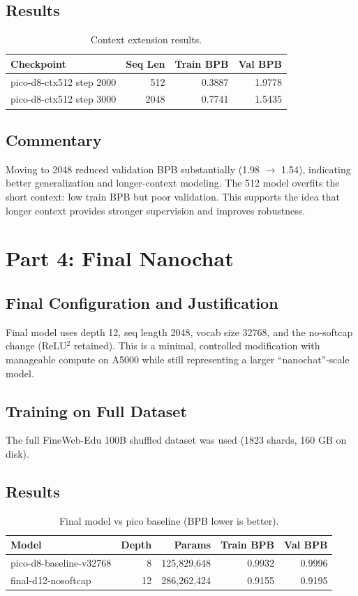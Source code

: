 \documentclass[11pt]{article}
\begin{document}
\subsection*{Results}
\begin{table}[h]
\centering
\begin{tabular}{l r r r}
\toprule
\textbf{Checkpoint} & \textbf{Seq Len} & \textbf{Train BPB} & \textbf{Val BPB} \\
\midrule
pico-d8-ctx512 step 2000 & 512 & 0.3887 & 1.9778 \\
pico-d8-ctx512 step 3000 & 2048 & 0.7741 & 1.5435 \\
\bottomrule
\end{tabular}
\caption{Context extension results.}
\end{table}

\subsection*{Commentary}
Moving to 2048 reduced validation BPB substantially (1.98 $\rightarrow$ 1.54), indicating better generalization and longer-context modeling. The 512 model overfits the short context: low train BPB but poor validation. This supports the idea that longer context provides stronger supervision and improves robustness.

\section*{Part 4: Final Nanochat}

\subsection*{Final Configuration and Justification}
Final model uses depth 12, seq length 2048, vocab size 32768, and the no-softcap change (ReLU$^2$ retained). This is a minimal, controlled modification with manageable compute on A5000 while still representing a larger ``nanochat''-scale model.

\subsection*{Training on Full Dataset}
The full FineWeb-Edu 100B shuffled dataset was used (1823 shards, 160 GB on disk).

\subsection*{Results}
\begin{table}[h]
\centering
\begin{tabular}{l r r r r}
\toprule
\textbf{Model} & \textbf{Depth} & \textbf{Params} & \textbf{Train BPB} & \textbf{Val BPB} \\
\midrule
pico-d8-baseline-v32768 & 8 & 125{,}829{,}648 & 0.9932 & 0.9996 \\
final-d12-nosoftcap & 12 & 286{,}262{,}424 & 0.9155 & 0.9195 \\
\bottomrule
\end{tabular}
\caption{Final model vs pico baseline (BPB lower is better).}
\end{table}
\end{document}
